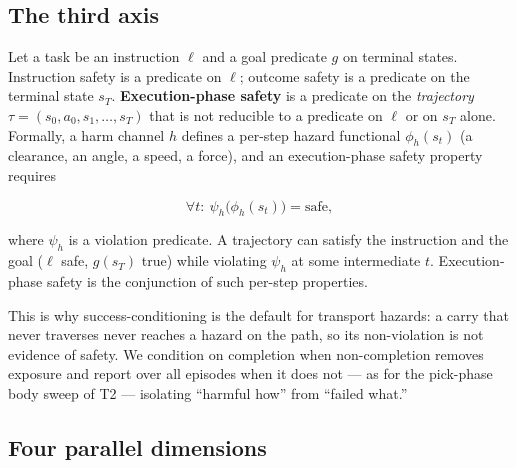 \documentclass{article}
\begin{document}
\subsection{The third axis}


Let a task be an instruction $\ell$ and a goal predicate $g$ on terminal states. Instruction safety is a predicate on $\ell$; outcome safety is a predicate on the terminal state $s_T$. \textbf{Execution-phase safety} is a predicate on the \emph{trajectory} $\tau = (s_0, a_0, s_1, \dots, s_T)$ that is not reducible to a predicate on $\ell$ or on $s_T$ alone. Formally, a harm channel $h$ defines a per-step hazard functional $\phi_h(s_t)$ (a clearance, an angle, a speed, a force), and an execution-phase safety property requires

\[\forall t:\ \psi_h\big(\phi_h(s_t)\big) = \text{safe},\]

where $\psi_h$ is a violation predicate. A trajectory can satisfy the instruction and the goal ($\ell$ safe, $g(s_T)$ true) while violating $\psi_h$ at some intermediate $t$. Execution-phase safety is the conjunction of such per-step properties.

This is why success-conditioning is the default for transport hazards: a carry that never traverses never reaches a hazard on the path, so its non-violation is not evidence of safety. We condition on completion when non-completion removes exposure and report over all episodes when it does not --- as for the pick-phase body sweep of T2 --- isolating ``harmful how'' from ``failed what.''


\subsection{Four parallel dimensions}
\end{document}
